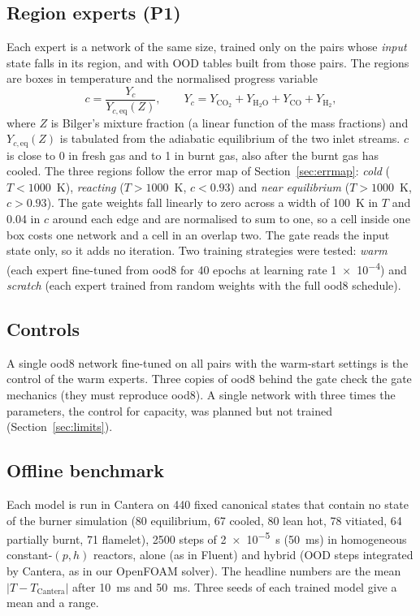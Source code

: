 \documentclass[preprint,review,12pt]{elsarticle}
\begin{document}
\subsection{Region experts (P1)}
\label{sec:p1}
Each expert is a network of the same size, trained only on the pairs whose \emph{input} state falls in its
region, and with OOD tables built from those pairs. The regions are boxes in temperature and the
normalised progress variable
\begin{equation}
  c = \frac{Y_c}{Y_{c,\mathrm{eq}}(Z)},\qquad Y_c = Y_\mathrm{CO_2}+Y_\mathrm{H_2O}+Y_\mathrm{CO}+Y_\mathrm{H_2},
\end{equation}
where $Z$ is Bilger's mixture fraction (a linear function of the mass fractions) and
$Y_{c,\mathrm{eq}}(Z)$ is tabulated from the adiabatic equilibrium of the two inlet streams. $c$ is close to
0 in fresh gas and to 1 in burnt gas, also after the burnt gas has cooled. The three regions follow the
error map of Section~\ref{sec:errmap}: \emph{cold} ($T<1000$~K), \emph{reacting} ($T>1000$~K, $c<0.93$) and
\emph{near equilibrium} ($T>1000$~K, $c>0.93$). The gate weights fall linearly to zero across a width of
100~K in $T$ and 0.04 in $c$ around each edge and are normalised to sum to one, so a cell inside one box
costs one network and a cell in an overlap two. The gate reads the input state only, so it adds no
iteration. Two training strategies were tested: \emph{warm} (each expert fine-tuned from ood8 for 40
epochs at learning rate \num{1e-4}) and \emph{scratch} (each expert trained from random weights with the
full ood8 schedule).

\subsection{Controls}
A single ood8 network fine-tuned on all pairs with the warm-start settings is the control of the warm
experts. Three copies of ood8 behind the gate check the gate mechanics (they must reproduce ood8). A
single network with three times the parameters, the control for capacity, was planned but not trained
(Section~\ref{sec:limits}).

\subsection{Offline benchmark}
\label{sec:bench}
Each model is run in Cantera on 440 fixed canonical states that contain no state of the burner
simulation (80 equilibrium, 67 cooled, 80 lean hot, 78 vitiated, 64 partially burnt, 71 flamelet),
2500 steps of \SI{2e-5}{s} (50~ms) in homogeneous constant-$(p,h)$ reactors, alone (as in Fluent) and
hybrid (OOD steps integrated by Cantera, as in our OpenFOAM solver). The headline numbers are the mean
$|T-T_\mathrm{Cantera}|$ after 10~ms and 50~ms. Three seeds of each trained model give a mean and a
range.
\end{document}
